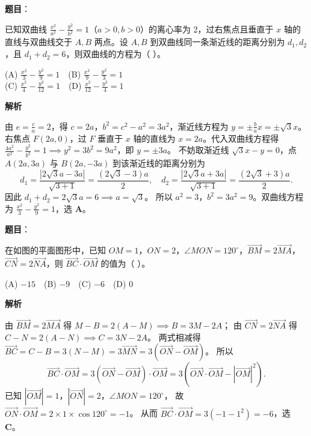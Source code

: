 \begin{answer}

\textbf{题目}：

已知双曲线 $\frac{x^2}{a^2}-\frac{y^2}{b^2}=1$（$a>0,b>0$）的离心率为 2，过右焦点且垂直于 $x$ 轴的直线与双曲线交于 $A,B$ 两点。设 $A,B$ 到双曲线同一条渐近线的距离分别为 $d_1,d_2$，且 $d_1+d_2=6$，则双曲线的方程为（ ）。

(A) $\frac{x^2}{3}-\frac{y^2}{9}=1$　(B) $\frac{x^2}{9}-\frac{y^2}{3}=1$\\
(C) $\frac{x^2}{4}-\frac{y^2}{12}=1$　(D) $\frac{x^2}{12}-\frac{y^2}{4}=1$

\textbf{解析}

由 $e=\frac ca=2$，得 $c=2a$，$b^2=c^2-a^2=3a^2$，渐近线方程为 $y=\pm\frac ba x=\pm\sqrt3 x$。
右焦点 $F(2a,0)$，过 $F$ 垂直于 $x$ 轴的直线为 $x=2a$。代入双曲线方程得 $\frac{4a^2}{a^2}-\frac{y^2}{b^2}=1\implies y^2=3b^2=9a^2$，即 $y=\pm 3a$。
不妨取渐近线 $\sqrt3 x-y=0$，点 $A(2a,3a)$ 与 $B(2a,-3a)$ 到该渐近线的距离分别为
\nopagebreak[4]
\[d_1=\frac{|2\sqrt3 a-3a|}{\sqrt{3+1}}=\frac{(2\sqrt3-3)a}{2},\quad d_2=\frac{|2\sqrt3 a+3a|}{\sqrt{3+1}}=\frac{(2\sqrt3+3)a}{2}.\]
因此 $d_1+d_2=2\sqrt3 a=6\implies a=\sqrt3$。
所以 $a^2=3$，$b^2=3a^2=9$。双曲线方程为 $\frac{x^2}{3}-\frac{y^2}{9}=1$，选 \textbf{A}。


\end{answer}
\begin{answer}

\textbf{题目}：

在如图的平面图形中，已知 $OM=1$，$ON=2$，$\angle MON=120^\circ$，$\overrightarrow{BM}=2\overrightarrow{MA}$，$\overrightarrow{CN}=2\overrightarrow{NA}$，则 $\overrightarrow{BC}\cdot\overrightarrow{OM}$ 的值为（ ）。
\nopagebreak[4]
\begin{center}\end{center}
\nopagebreak[4]
(A) $-15$　(B) $-9$　(C) $-6$　(D) 0

\textbf{解析}

由 $\overrightarrow{BM}=2\overrightarrow{MA}$ 得 $M-B=2(A-M)\implies B=3M-2A$；
由 $\overrightarrow{CN}=2\overrightarrow{NA}$ 得 $C-N=2(A-N)\implies C=3N-2A$。
两式相减得 $\overrightarrow{BC}=C-B=3(N-M)=3\overrightarrow{MN}=3(\overrightarrow{ON}-\overrightarrow{OM})$。
所以
\nopagebreak[4]
\[\overrightarrow{BC}\cdot\overrightarrow{OM}=3(\overrightarrow{ON}-\overrightarrow{OM})\cdot\overrightarrow{OM}=3(\overrightarrow{ON}\cdot\overrightarrow{OM}-|\overrightarrow{OM}|^2).\]
已知 $|\overrightarrow{OM}|=1$，$|\overrightarrow{ON}|=2$，$\angle MON=120^\circ$，
故 $\overrightarrow{ON}\cdot\overrightarrow{OM}=2\times 1\times\cos 120^\circ=-1$。
从而 $\overrightarrow{BC}\cdot\overrightarrow{OM}=3(-1-1^2)=-6$，选 \textbf{C}。


\end{answer}


